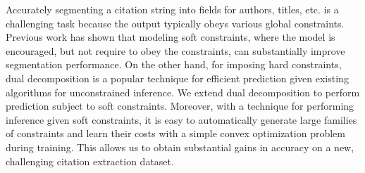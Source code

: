 Accurately segmenting a citation string into fields for authors, titles, etc. is a challenging  task because the output typically obeys various global constraints.  Previous work has shown that modeling soft constraints, where the model is encouraged, but not require to obey the constraints, can substantially improve segmentation performance. On the other hand, for imposing hard constraints, dual decomposition is a popular technique for efficient prediction given existing algorithms for unconstrained inference. We extend dual decomposition to perform prediction subject to soft constraints. Moreover, with a technique for performing inference given soft constraints, it is easy to automatically generate large families of constraints and learn their costs with a simple convex optimization problem during training. This allows us to obtain substantial gains in accuracy on a new, challenging citation extraction dataset.
